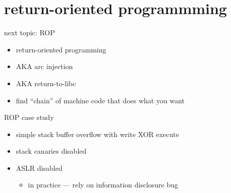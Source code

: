 \begin{comment}
\begin{frame}{does ASLR+NX?}
    \begin{itemize}
    \item ASLR is ineffective due to information leaks
        \begin{itemize}
        \item if there's a memory error, pointer values are probably available
        \item any pointer value on stack --- all other addresses on stack
        \item any pointer value in library --- all other addresses in library
        \end{itemize}
    \item NX is ineffective in practice due to \myemph{return-oriented programming}
    \end{itemize}
\end{frame}
\end{comment}

\section{return-oriented programmming}

\begin{frame}{next topic: ROP}
    \begin{itemize}
    \item return-oriented programming
    \item AKA arc injection
    \item AKA return-to-libc
    \vspace{.5cm}
    \item find ``chain'' of machine code that does what you want
    \end{itemize}
\end{frame}

\begin{frame}{ROP case study}
    \begin{itemize}
    \item simple stack buffer overflow with write XOR execute
    \item stack canaries disabled
    \item ASLR disabled
        \begin{itemize}
        \item in practice --- rely on information disclosure bug
        \end{itemize}
    \end{itemize}
\end{frame}

